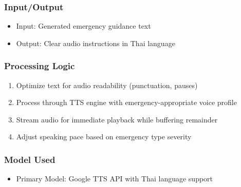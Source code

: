 \subsubsection{Input/Output}
\begin{itemize}
    \item Input: Generated emergency guidance text
    \item Output: Clear audio instructions in Thai language
\end{itemize}

\subsubsection{Processing Logic}
\begin{enumerate}
    \item Optimize text for audio readability (punctuation, pauses)
    \item Process through TTS engine with emergency-appropriate voice profile
    \item Stream audio for immediate playback while buffering remainder
    \item Adjust speaking pace based on emergency type severity
\end{enumerate}

\subsubsection{Model Used}
\begin{itemize}
    \item Primary Model: Google TTS API with Thai language support
\end{itemize}



